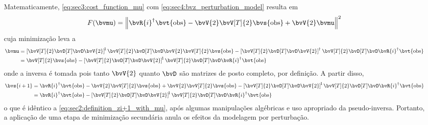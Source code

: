 Matematicamente, \cref{eq:sec3:cost_function_mu} com \cref{eq:sec4:bvz_perturbation_model} resulta em
\begin{equation}
	F(\bvmu) = \norm{\pinv{\bvR{i}} \bvt{\obs} - \bvV{2}\bvV[T]{2} \bvs{\obs} + \bvV{2} \bvmu}^2
\end{equation}
cuja minimização leva a
\begin{equation}
	\begin{split}
		\bvmu
		& = \inv*{\bvV[T]{2} \bvD[T] \bvD \bvV{2}} \bvV[T]{2} \bvD[T] \bvD \bvV{2} \bvV[T]{2} \bvs{\obs} - \pinv*{\bvV[T]{2} \bvD[T] \bvD \bvV{2}} \bvV[T]{2} \bvD[T] \bvD \pinv{\bvR{i}} \bvt{\obs} \\
		& = \bvV[T]{2} \bvs{\obs} - \inv*{\bvV[T]{2} \bvD[T] \bvD \bvV{2}} \bvV[T]{2} \bvD[T] \bvD \pinv{\bvR{i}} \bvt{\obs}
	\end{split}
\end{equation}
onde a inversa é tomada pois tanto $\bvV{2}$ quanto $\bvD$ são matrizes de posto completo, por definição. A partir disso,
\begin{equation}
	\begin{split}
		\bvs{i+1}
		& = \pinv{\bvR{i}} \bvt{\obs} - \bvV{2}\bvV[T]{2} \bvs{\obs} + \bvV{2} \bvV[T]{2} \bvs{\obs} - \inv*{\bvV[T]{2} \bvD[T] \bvD \bvV{2}} \bvV[T]{2} \bvD[T] \bvD \pinv{\bvR{i}} \bvt{\obs} \\
		& = \pinv{\bvR{i}} \bvt{\obs} - \inv*{\bvV[T]{2} \bvD[T] \bvD \bvV{2}} \bvV[T]{2} \bvD[T] \bvD \pinv{\bvR{i}} \bvt{\obs}
	\end{split}
\end{equation}
o que é idêntico a \cref{eq:sec2:definition_zi+1_with_mu}, após algumas manipulações algébricas e uso apropriado da pseudo-inversa. Portanto, a aplicação de uma etapa de minimização secundária anula os efeitos da modelagem por perturbação.
